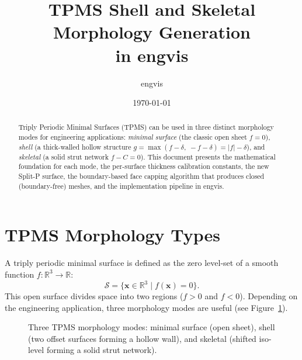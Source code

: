 \documentclass[11pt]{article}
\title{TPMS Shell and Skeletal Morphology Generation\\in engvis}
\author{engvis}
\date{\today}
\begin{document}
\maketitle

\begin{abstract}
Triply Periodic Minimal Surfaces (TPMS) can be used in three distinct
morphology modes for engineering applications: \emph{minimal surface}
(the classic open sheet $f=0$), \emph{shell} (a thick-walled hollow
structure $g = \max(f-\delta,\;-f-\delta) = |f|-\delta$), and
\emph{skeletal} (a solid strut network $f - C = 0$).  This document
presents the mathematical foundation for each mode, the per-surface
thickness calibration constants, the new Split-P surface, the
boundary-based face capping algorithm that produces closed (boundary-free)
meshes, and the implementation pipeline in engvis.
\end{abstract}

\section{TPMS Morphology Types}

A triply periodic minimal surface is defined as the zero level-set of
a smooth function $f\colon\mathbb{R}^3 \to \mathbb{R}$:
\begin{equation}\label{eq:tpms-levelset}
  \mathcal{S} = \bigl\{\mathbf{x} \in \mathbb{R}^3 \;\big|\; f(\mathbf{x}) = 0\bigr\}.
\end{equation}
This open surface divides space into two regions ($f>0$ and $f<0$).
Depending on the engineering application, three morphology modes are
useful (see Figure~\ref{fig:morphology-comparison}).

\begin{figure}[h]
\centering
{}
\caption{Three TPMS morphology modes: minimal surface (open sheet),
shell (two offset surfaces forming a hollow wall), and skeletal
(shifted iso-level forming a solid strut network).}
\label{fig:morphology-comparison}
\end{figure}
\end{document}
